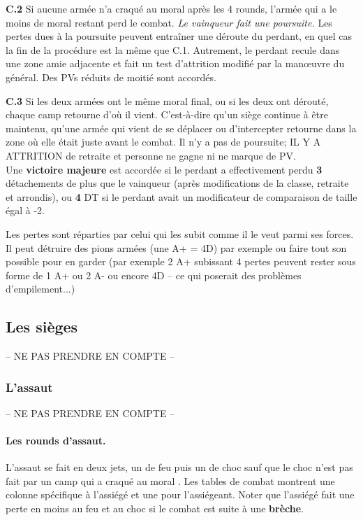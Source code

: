 {\bf C.2} Si aucune armée n'a craqué au moral après les 4 rounds, l'armée qui a le moins de moral restant perd 
le combat. \textit{Le vainqueur fait une poursuite.} Les pertes dues à la poursuite 
peuvent entraîner une déroute du perdant, en quel cas la fin de la procédure est la même
que C.1. Autrement, le perdant recule dans une zone amie adjacente et fait un test d'attrition
modifié par la man{\oe}uvre du général. Des PVs réduits de moitié sont accordés.

{\bf C.3} Si les deux armées ont le même moral final, ou si les deux ont dérouté, 
chaque camp retourne d'où il vient. C'est-à-dire qu'un siège continue à être maintenu, qu'une
armée qui vient de se déplacer ou d'intercepter retourne dans la zone où elle était juste
avant le combat. Il n'y a pas de poursuite; IL Y A ATTRITION de retraite et personne ne gagne
ni ne marque de PV.\\   

Une \textbf{victoire majeure} est accordée si le perdant a effectivement perdu 
\textbf{3} détachements
de plus que le vainqueur (après modifications de la classe, retraite et arrondis),
ou \textbf{4} DT si le perdant avait un modificateur de comparaison de taille
égal à -2.

Les pertes sont réparties par celui qui les subit comme il le veut parmi ses forces.
Il peut détruire des pions armées (une A+ = 4D) par exemple ou faire tout son
possible pour en garder (par exemple 2 A+ subissant 4 pertes peuvent rester sous
forme de 1 A+ ou 2 A- ou encore 4D -- ce qui poserait des problèmes d'empilement...)

\subsection{Les sièges}
-- NE PAS PRENDRE EN COMPTE --


\subsubsection{L'assaut}
-- NE PAS PRENDRE EN COMPTE --


\paragraph{Les rounds d'assaut.}
L'assaut se fait en deux jets, un de feu puis un de choc sauf que 
le choc n'est pas fait par un camp qui a craqué au moral .
Les tables de combat montrent une colonne spécifique à l'assiégé et une pour l'assiégeant.
Noter que l'assiégé fait une perte en moins au feu et au choc si le combat est 
suite à une \textbf{brèche}.


